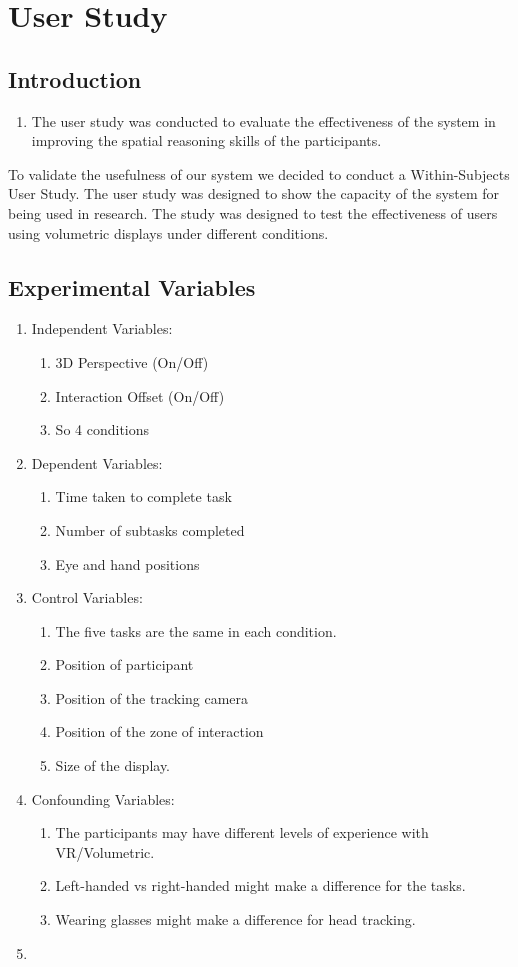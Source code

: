 \section{User Study}
\subsection{Introduction}
\begin{enumerate}
	\item The user study was conducted to evaluate the effectiveness of the system in improving the spatial reasoning skills of the participants.
\end{enumerate}

To validate the usefulness of our system we decided to conduct a Within-Subjects User Study. The user study was designed to show the capacity of the system for being used in research. The study was designed to test the effectiveness of users using volumetric displays under different conditions.

\subsection{Experimental Variables}
\begin{enumerate}
	\item Independent Variables:
	\begin{enumerate}
		\item 3D Perspective (On/Off)
		\item Interaction Offset (On/Off)
		\item So 4 conditions
	\end{enumerate}
	\item Dependent Variables:
	\begin{enumerate}
		\item Time taken to complete task
		\item Number of subtasks completed
		\item Eye and hand positions
	\end{enumerate}
	\item Control Variables:
	\begin{enumerate}
		\item The five tasks are the same in each condition.
		\item Position of participant
		\item Position of the tracking camera
		\item Position of the zone of interaction
		\item Size of the display. 
	\end{enumerate}
	\item Confounding Variables:
	\begin{enumerate}
		\item The participants may have different levels of experience with VR/Volumetric.
		\item Left-handed vs right-handed might make a difference for the tasks.
		\item Wearing glasses might make a difference for head tracking.
	\end{enumerate}
	\item 
\end{enumerate}

